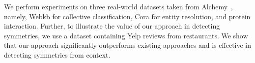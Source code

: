 
We perform experiments on three real-world datasets taken from Alchemy~\cite{kok&al06}, namely, Webkb for collective classification, Cora for entity resolution, and protein interaction. Further, to illustrate the value of our approach in detecting symmetries, we use a dataset containing Yelp reviews from restaurants. We show that our approach significantly outperforms existing approaches and is effective in detecting symmetries from context.






